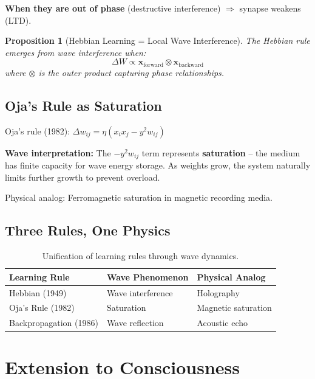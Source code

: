 \documentclass{article}
\newtheorem{proposition}[theorem]{Proposition}
\begin{document}
\textbf{When they are out of phase} (destructive interference) $\Rightarrow$ synapse weakens (LTD).

\begin{proposition}[Hebbian Learning = Local Wave Interference]
The Hebbian rule emerges from wave interference when:
\begin{equation}
\Delta W \propto \mathbf{x}_{\text{forward}} \otimes \mathbf{x}_{\text{backward}}
\end{equation}
where $\otimes$ is the outer product capturing phase relationships.
\end{proposition}

\subsection{Oja's Rule as Saturation}

Oja's rule (1982): $\Delta w_{ij} = \eta(x_i x_j - y^2 w_{ij})$

\textbf{Wave interpretation:} The $-y^2 w_{ij}$ term represents \textbf{saturation} -- the medium has finite capacity for wave energy storage. As weights grow, the system naturally limits further growth to prevent overload.

Physical analog: Ferromagnetic saturation in magnetic recording media.

\subsection{Three Rules, One Physics}

\begin{table}[h]
\centering
\begin{tabular}{l|l|l}
\textbf{Learning Rule} & \textbf{Wave Phenomenon} & \textbf{Physical Analog} \\ \hline
Hebbian (1949) & Wave interference & Holography \\
Oja's Rule (1982) & Saturation & Magnetic saturation \\
Backpropagation (1986) & Wave reflection & Acoustic echo \\
\end{tabular}
\caption{Unification of learning rules through wave dynamics.}
\label{tab:unification}
\end{table}

\section{Extension to Consciousness}
\label{sec:consciousness}
\end{document}
